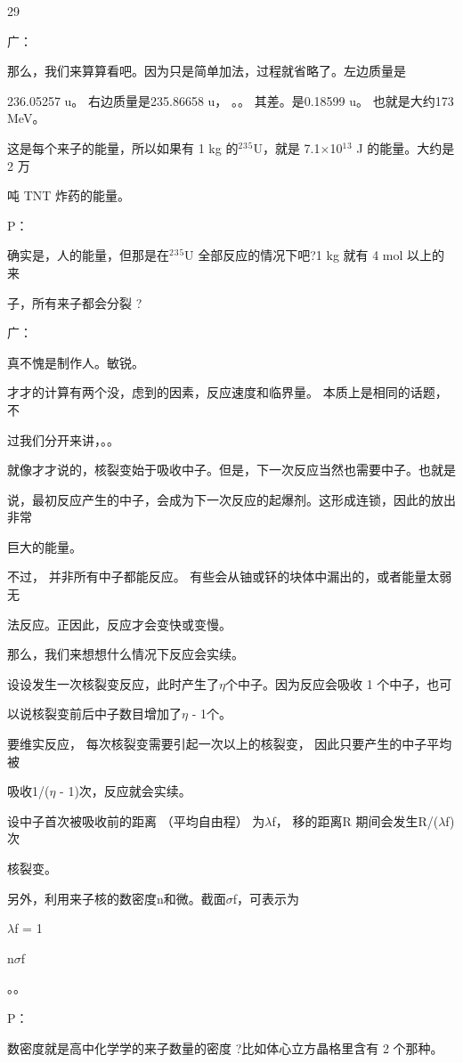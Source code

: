 29\par
广：\par
那么，我们来算算看吧。因为只是简单加法，过程就省略了。左边质量是\par
236.05257 u。 右边质量是235.86658 u， 。。 其差。是0.18599 u。 也就是大约173 MeV。\par
这是每个来子的能量，所以如果有 1 kg 的$^{2}$$^{3}$$^{5}$U，就是 7.1$\times$10$^{1}$$^{3}$ J 的能量。大约是 2 万\par
吨 TNT 炸药的能量。\par
P：\par
确实是，人的能量，但那是在$^{2}$$^{3}$$^{5}$U 全部反应的情况下吧?1 kg 就有 4 mol 以上的来\par
子，所有来子都会分裂 ?\par
广：\par
真不愧是制作人。敏锐。\par
才才的计算有两个没，虑到的因素，反应速度和临界量。 本质上是相同的话题，不\par
过我们分开来讲，。。\par
就像才才说的，核裂变始于吸收中子。但是，下一次反应当然也需要中子。也就是\par
说，最初反应产生的中子，会成为下一次反应的起爆剂。这形成连锁，因此的放出非常\par
巨大的能量。\par
不过， 并非所有中子都能反应。 有些会从铀或钚的块体中漏出的，或者能量太弱无\par
法反应。正因此，反应才会变快或变慢。\par
那么，我们来想想什么情况下反应会实续。\par
设设发生一次核裂变反应，此时产生了$\eta$个中子。因为反应会吸收 1 个中子，也可\par
以说核裂变前后中子数目增加了$\eta$ - 1个。\par
要维实反应， 每次核裂变需要引起一次以上的核裂变， 因此只要产生的中子平均被\par
吸收1/($\eta$ - 1)次，反应就会实续。\par
设中子首次被吸收前的距离 （平均自由程） 为$\lambda$f， 移的距离R 期间会发生R/($\lambda$f)次\par
核裂变。\par
另外，利用来子核的数密度n和微。截面$\sigma$f，可表示为\par
$\lambda$f = 1\par
n$\sigma$f\par
。。\par
P：\par
数密度就是高中化学学的来子数量的密度 ?比如体心立方晶格里含有 2 个那种。\par

